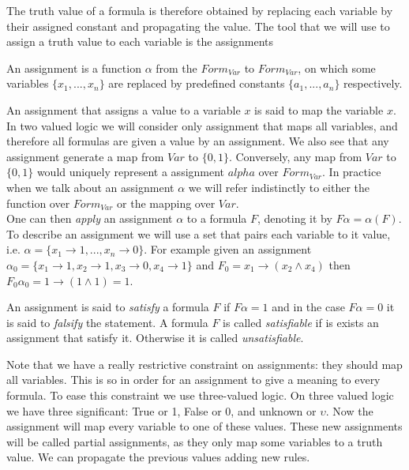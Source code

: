 The truth value of a formula is therefore obtained by replacing each variable by their assigned constant and propagating the value. The tool that we will use to assign a truth value to each variable is the assignments
\begin{definition}
  An assignment is a function $\alpha$ from the $Form_{Var}$ to $Form_{Var}$, on which some variables $\{x_1,...,x_n \}$ are replaced by predefined constants $\{a_1,...,a_n\}$ respectively.\\
\end{definition}

An assignment that assigns a value to a variable $x$ is said to map the variable $x$. In two valued logic we will consider only assignment that maps all variables, and therefore all formulas are given a value by an assignment. We also see that any assignment generate a map from $Var$ to $\{0,1\}$. Conversely, any map from $Var$ to $\{0,1\}$ would uniquely represent a assignment $alpha$ over $Form_{Var}$. In practice when we talk about an assignment $\alpha$ we will refer indistinctly to either the function over $Form_{Var}$ or the mapping  over $Var$.\\

One can then \emph{apply} an assignment $\alpha$ to a formula $F$, denoting it by $F\alpha=\alpha(F)$. To describe an assignment we will use a set that pairs each variable to it value, i.e. $\alpha=\{x_1\to 1,...,x_n\to 0\}$. For example given an assignment $\alpha_0 = \{x_1 \to 1, x_2\to 1, x_3 \to 0, x_4 \to 1\}$ and $F_0=x_1\to (x_2\wedge x_4)$ then  $F_0\alpha_0=1 \to (1\wedge 1)= 1$. \\    

\begin{definition}
  An assignment is said to \emph{satisfy}  a formula $F$ if $F\alpha=1$ and in the case $F  \alpha = 0 $ it is said to \emph{falsify} the statement. A formula $F$ is called \emph{satisfiable} if is exists an assignment that satisfy it. Otherwise it is called \emph{unsatisfiable}.
\end{definition}


Note that we have a really restrictive constraint on assignments: they should map all variables.  This is so in order for an assignment to give a meaning to every formula. To ease this constraint we use three-valued logic. On three valued logic we have three significant: True or 1, False or 0, and unknown or $\upsilon$. Now the assignment will map every variable to one of these values. These new assignments will be called partial assignments, as they only map some variables to a truth value. We can propagate the previous values adding new rules.

